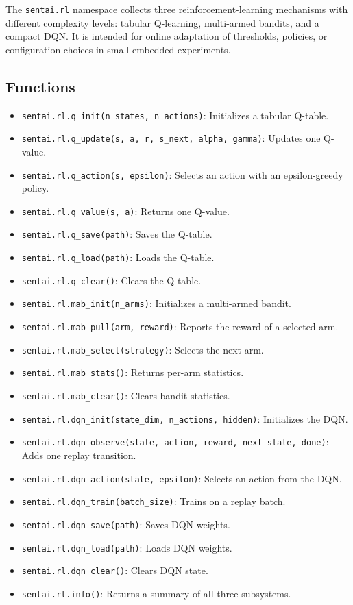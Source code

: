 The \texttt{sentai.rl} namespace collects three reinforcement-learning
mechanisms with different complexity levels: tabular Q-learning,
multi-armed bandits, and a compact DQN. It is intended for online
adaptation of thresholds, policies, or configuration choices in small
embedded experiments.

\subsection{Functions}\label{functions-21}

\begin{itemize}
\tightlist
\item
  \texttt{sentai.rl.q\_init(n\_states,\ n\_actions)}: Initializes a
  tabular Q-table.
\item
  \texttt{sentai.rl.q\_update(s,\ a,\ r,\ s\_next,\ alpha,\ gamma)}:
  Updates one Q-value.
\item
  \texttt{sentai.rl.q\_action(s,\ epsilon)}: Selects an action with an
  epsilon-greedy policy.
\item
  \texttt{sentai.rl.q\_value(s,\ a)}: Returns one Q-value.
\item
  \texttt{sentai.rl.q\_save(path)}: Saves the Q-table.
\item
  \texttt{sentai.rl.q\_load(path)}: Loads the Q-table.
\item
  \texttt{sentai.rl.q\_clear()}: Clears the Q-table.
\item
  \texttt{sentai.rl.mab\_init(n\_arms)}: Initializes a multi-armed
  bandit.
\item
  \texttt{sentai.rl.mab\_pull(arm,\ reward)}: Reports the reward of a
  selected arm.
\item
  \texttt{sentai.rl.mab\_select(strategy)}: Selects the next arm.
\item
  \texttt{sentai.rl.mab\_stats()}: Returns per-arm statistics.
\item
  \texttt{sentai.rl.mab\_clear()}: Clears bandit statistics.
\item
  \texttt{sentai.rl.dqn\_init(state\_dim,\ n\_actions,\ hidden)}:
  Initializes the DQN.
\item
  \texttt{sentai.rl.dqn\_observe(state,\ action,\ reward,\ next\_state,\ done)}:
  Adds one replay transition.
\item
  \texttt{sentai.rl.dqn\_action(state,\ epsilon)}: Selects an action
  from the DQN.
\item
  \texttt{sentai.rl.dqn\_train(batch\_size)}: Trains on a replay batch.
\item
  \texttt{sentai.rl.dqn\_save(path)}: Saves DQN weights.
\item
  \texttt{sentai.rl.dqn\_load(path)}: Loads DQN weights.
\item
  \texttt{sentai.rl.dqn\_clear()}: Clears DQN state.
\item
  \texttt{sentai.rl.info()}: Returns a summary of all three subsystems.
\end{itemize}

